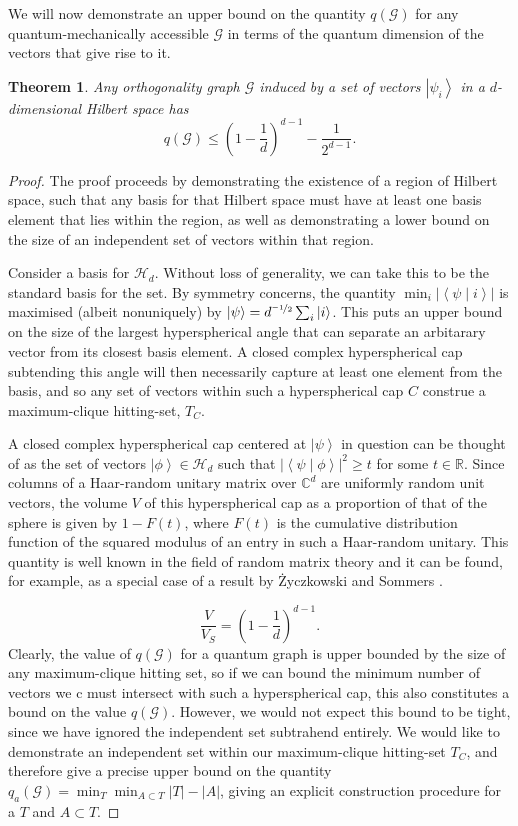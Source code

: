 \documentclass{amsart}
\newtheorem{thm}{Theorem}
\theoremstyle{definition}
\newcommand{\ket}[1]{{\left\vert{#1}\right\rangle}}
\newcommand{\braket}[2]{{\left< {#1} \middle\vert {#2}\right>}}
\newcommand{\sprod}[2]{\left|\left< {#1} \middle| {#2} \right>\right|}
\begin{document}
We will now demonstrate an upper bound on the quantity $q(\mathcal{G})$ for any quantum-mechanically accessible $\mathcal{G}$ in terms of the quantum dimension of the vectors that give rise to it.
\begin{thm}\label{main}
Any orthogonality graph $\mathcal{G}$ induced by a set of vectors $\ket{\psi_i}$ in a $d$-dimensional Hilbert space has
\begin{equation}
q(\mathcal{G}) \leq \left(1-\frac1d\right)^{d-1}-\frac{1}{2^{d-1}}.
\end{equation}
\end{thm}
\begin{proof}
The proof proceeds by demonstrating the existence of a region of Hilbert space, such that any basis for that Hilbert space must have at least one basis element that lies within the region, as well as demonstrating a lower
bound on the size of an independent set of vectors within that region.

Consider a basis for $\mathcal{H}_d$. Without loss of generality, we can take this to be the standard basis for the set. By symmetry concerns, the quantity $\min_i \left|\braket{\psi}{i}\right|$ is maximised (albeit nonuniquely) by $\ket{\psi}=d^{\nicefrac{-1}{2}}\sum_i\ket{i}$. This puts an upper bound on the size of the largest hyperspherical angle that can separate an arbitarary vector from its closest basis element. A closed complex hyperspherical cap subtending this angle will then necessarily capture at least one element from the basis, and so any set of vectors within such a hyperspherical cap $C$ construe a maximum-clique hitting-set, $T_C$.

A closed complex hyperspherical cap centered at $\ket{\psi}$ in question can be thought of as the set of vectors $\ket{\phi}\in\mathcal{H}_d$ such that $\sprod{\psi}{\phi}^2\geq t$ for some $t\in\mathbb{R}$. Since columns of a Haar-random unitary matrix over $\mathbb{C}^d$ are uniformly random unit vectors, the volume $V$ of this hyperspherical cap as a proportion of that of the sphere is given by $1-F(t)$, where $F(t)$ is the cumulative distribution function of the squared  modulus of an entry in such a Haar-random unitary. This quantity is well known in the field of random matrix theory and it can be found, for example, as a special case of a result by \.{Z}yczkowski and Sommers \cite{Zycz2000}.

\begin{equation}
\frac{V}{V_S}=\left(1-\frac1d \right)^{d-1}.
\end{equation}
Clearly, the value of $q(\mathcal{G})$ for a quantum graph is upper bounded by the size of any maximum-clique hitting set, so if we can bound the minimum number of vectors we c must intersect with such a hyperspherical cap, this also constitutes a bound on the value $q(\mathcal{G})$. However, we would not expect this bound to be tight, since we have ignored the independent set subtrahend entirely. We would like to demonstrate an independent set within our maximum-clique hitting-set $T_C$, and therefore give a precise upper bound on the quantity $q_a(\mathcal{G})=\min_T \min_{A\subset T} |T|-|A|$, giving an explicit construction procedure for a $T$ and $A\subset T$.


\end{proof}
\end{document}
